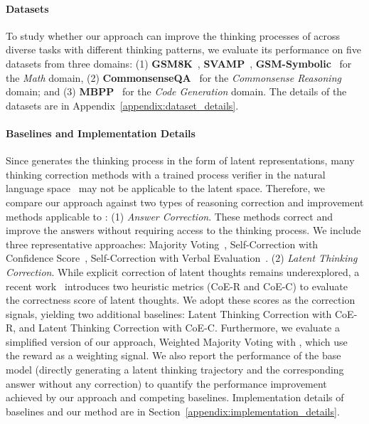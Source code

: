 \documentclass{article} %
\begin{document}
\paragraph*{Datasets}
To study whether our approach can improve the thinking processes of \LRLM across diverse tasks with different thinking patterns, we evaluate its performance on five datasets from three domains: (1) \textbf{GSM8K}~\citep{cobbe2021training}, \textbf{SVAMP}~\citep{patel2021nlp}, \textbf{GSM-Symbolic}~\citep{mirzadeh2025gsmsymbolic} for the \textit{Math} domain, (2) \textbf{CommonsenseQA}~\citep{talmor2019commonsenseqa} for the \textit{Commonsense Reasoning} domain; and (3) \textbf{MBPP}~\citep{austin2021program} for the \textit{Code Generation} domain. The details of the datasets are in Appendix~\ref{appendix:dataset_details}.
%
\paragraph*{Baselines and Implementation Details} 
Since \LRLM generates the thinking process in the form of latent representations, many thinking correction methods with a trained process verifier in the natural language space~\citep{lu2024autopsv,wang-etal-2024-math} may not be applicable to the latent space. 
%
Therefore, we compare our approach against two types of reasoning correction and improvement methods applicable to \LRLM: 
%
(1) \textit{Answer Correction}. These methods correct and improve the answers without requiring access to the thinking process. We include three representative approaches: Majority Voting~\citep{wang2023selfconsistency}, Self-Correction with Confidence Score~\citep{ren2023self}, Self-Correction with Verbal Evaluation~\citep{manakul2023selfcheckgpt}.
%
(2) \textit{Latent Thinking Correction}. While explicit correction of latent thoughts remains underexplored, a recent work~\citep{wang2025latent} introduces two heuristic metrics (CoE-R and CoE-C) to evaluate the correctness score of latent thoughts. We adopt these scores as the correction signals, yielding two additional baselines: Latent Thinking Correction with CoE-R, and Latent Thinking Correction with CoE-C.
%
Furthermore, we evaluate a simplified version of our approach, Weighted Majority Voting with \LRM, which use the \LRM reward as a weighting signal. 
%
We also report the performance of the base model (directly generating a latent thinking trajectory and the corresponding answer without any correction) to quantify the performance improvement achieved by our approach and competing baselines.
%
Implementation details of baselines and our method are in Section~\ref{appendix:implementation_details}.
\end{document}
